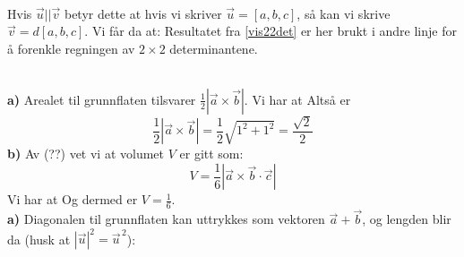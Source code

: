 \\
Hvis $ \vec{u}||\vec{v} $ betyr dette at hvis vi skriver $ \vec{u}=[a, b, c] $, så kan vi skrive $ \vec{v}=d[a, b, c] $. Vi får da at:
Resultatet fra \ref{vis22det} er her brukt i andre linje for å forenkle regningen av $ 2\times2 $ determinantene.

\\
\textbf{a)} Arealet til grunnflaten tilsvarer $ \frac{1}{2}|\vec{a}\times\vec{b}| $. Vi har at
Altså er 
\[ \frac{1}{2}|\vec{a}\times\vec{b} |= \frac{1}{2}\sqrt{1^2+1^2} = \frac{\sqrt{2}}{2} \]
\textbf{b)} Av (??) vet vi at volumet $ V $ er gitt som:
\[ V = \frac{1}{6}|\vec{a}\times\vec{b} \cdot \vec{c}| \]
Vi har at
Og dermed er $ V=\frac{1}{6} $.
\newpage
{}\\
\textbf{a)} Diagonalen til grunnflaten kan uttrykkes som vektoren $ \vec{a}+\vec{b} $, og lengden blir da (husk at $ |\vec{u}|^2 = \vec{u}^{\,2} $):
